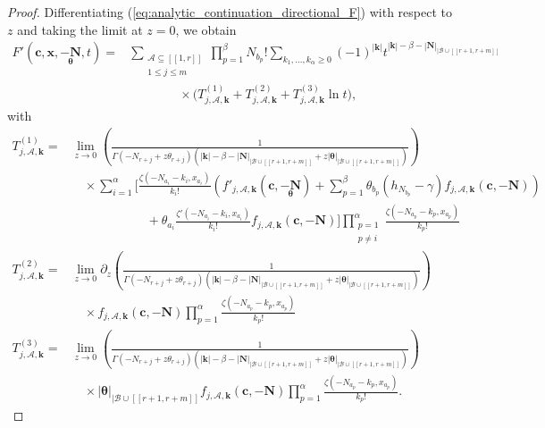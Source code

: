 \documentclass[a4paper]{amsart}
\theoremstyle{remark}
\theoremstyle{definition}
\begin{document}
\begin{proof}
Differentiating (\ref{eq:analytic_continuation_directional_F}) with respect to $z$ and taking the limit at $z=0$, we obtain
\begin{align}
    F'(\mathbf{c},\mathbf{x},\underset{\bm{\theta}}{-\mathbf{N}},t) =& \sum_{\substack{\mathcal{A} \subseteq [\![1,r]\!] \\ 1 \leq j \leq m}} \prod_{p=1}^{\beta} N_{b_p}! \sum_{k_1,\ldots,k_{\alpha}\geq 0} (-1)^{|\mathbf{k}|} t^{|\mathbf{k}|-\beta-|\mathbf{N}|_{|\mathcal{B}\cup [\![ r+1,r+m ]\!]}} \label{eq:formula_F_prime_computations} \\
    & \qquad \qquad \times \big(T^{(1)}_{j,\mathcal{A},\mathbf{k}}+T^{(2)}_{j,\mathcal{A},\mathbf{k}}+T^{(3)}_{j,\mathcal{A},\mathbf{k}} \ln t\big), \nonumber
\end{align}
with 
\begin{align*}
    T^{(1)}_{j,\mathcal{A},\mathbf{k}}=& \lim_{z \to 0} \left( \frac{1}{\Gamma(-N_{r+j}+z\theta_{r+j})(|\mathbf{k}|-\beta-|\mathbf{N}|_{|\mathcal{B}\cup [\![ r+1,r+m ]\!]}+z|\bm{\theta}|_{|\mathcal{B}\cup [\![ r+1,r+m ]\!]})} \right) \\
    & \quad \times \sum_{i=1}^{\alpha} \Biggl[ \frac{\zeta(-N_{a_i}-k_i,x_{a_i})}{k_{i}!} \left( f'_{j,\mathcal{A},\mathbf{k}}(\mathbf{c},\underset{\bm{\theta}}{-\mathbf{N}}) + \sum_{p=1}^{\beta} \theta_{b_{p}}(h_{N_{b_p}}-\gamma) f_{j,\mathcal{A},\mathbf{k}}(\mathbf{c},-\mathbf{N}) \right) \\
    & \qquad \qquad \qquad + \theta_{a_i}\frac{\zeta'(-N_{a_i}-k_i,x_{a_i})}{k_{i}!} f_{j,\mathcal{A},\mathbf{k}}(\mathbf{c},-\mathbf{N}) \Biggr] \prod_{\substack{p=1 \\ p \neq i}}^{\alpha} \frac{\zeta(-N_{a_p}-k_p,x_{a_p})}{k_p!} \\
    T^{(2)}_{j,\mathcal{A},\mathbf{k}}=& \lim_{z \to 0} \partial_z \left( \frac{1}{\Gamma(-N_{r+j}+z\theta_{r+j})(|\mathbf{k}|-\beta-|\mathbf{N}|_{|\mathcal{B}\cup [\![ r+1,r+m ]\!]}+z|\bm{\theta}|_{|\mathcal{B} \cup [\![ r+1,r+m ]\!]})} \right) \\
    & \quad \times f_{j,\mathcal{A},\mathbf{k}}(\mathbf{c},-\mathbf{N}) \prod_{p=1}^{\alpha} \frac{\zeta(-N_{a_p}-k_p,x_{a_p})}{k_p!} \\
    T^{(3)}_{j,\mathcal{A},\mathbf{k}}=& \lim_{z \to 0} \left( \frac{1}{\Gamma(-N_{r+j}+z\theta_{r+j})(|\mathbf{k}|-\beta-|\mathbf{N}|_{|\mathcal{B}\cup [\![ r+1,r+m ]\!]}+z|\bm{\theta}|_{|\mathcal{B}\cup [\![ r+1,r+m ]\!]})} \right) \\
    & \quad \times |\bm{\theta}|_{|\mathcal{B}\cup [\![ r+1,r+m ]\!]} f_{j,\mathcal{A},\mathbf{k}}(\mathbf{c},-\mathbf{N}) \prod_{p=1}^{\alpha} \frac{\zeta(-N_{a_p}-k_p,x_{a_p})}{k_p!}.
\end{align*}


\end{proof}
\end{document}
